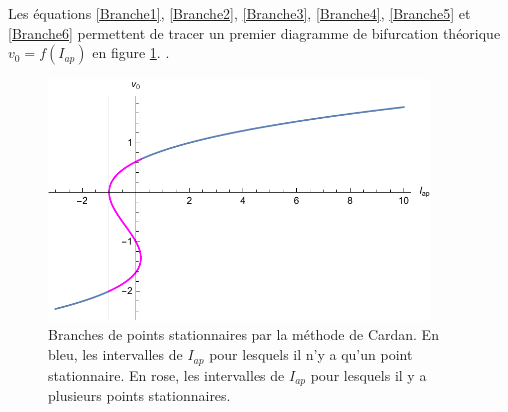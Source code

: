 \documentclass[12pt,a4paper,onecolumn]{article}
\begin{document}
Les équations \ref{Branche1}, \ref{Branche2}, \ref{Branche3}, \ref{Branche4}, \ref{Branche5} et \ref{Branche6} permettent de tracer un premier diagramme de
bifurcation théorique $v_0 = f(I_{ap})$ en figure \ref{Graph_cardan}.
.
\begin{figure}[H]
\begin{center}
\includegraphics[origin =c, width = 0.9\textwidth]{Cardan}
\end{center}
\caption{Branches de points stationnaires par la méthode de Cardan. En bleu, les intervalles de $I_{ap}$ pour lesquels il n'y a qu'un point stationnaire. En rose, les intervalles de $I_{ap}$ pour lesquels il y a plusieurs points stationnaires.}
\label{Graph_cardan}
\end{figure}
\end{document}
